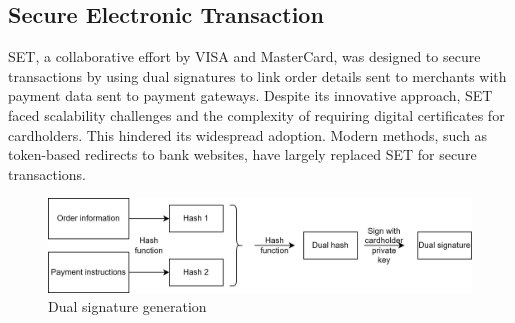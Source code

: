 \subsection{Secure Electronic Transaction}
SET, a collaborative effort by VISA and MasterCard, was designed to secure transactions by using dual signatures to link order details sent to merchants with payment data sent to payment gateways. 
Despite its innovative approach, SET faced scalability challenges and the complexity of requiring digital certificates for cardholders. 
This hindered its widespread adoption. 
Modern methods, such as token-based redirects to bank websites, have largely replaced SET for secure transactions.
\begin{figure}[H]
    \centering
    \includegraphics[width=1.0\linewidth]{images/dsg.png}
    \caption{Dual signature generation}
\end{figure}
